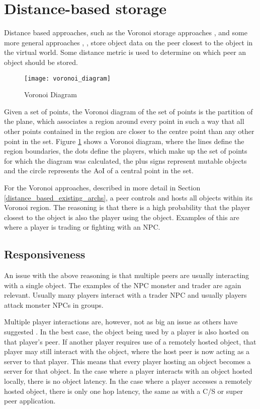 \section{Distance-based storage}
\label{distance_based_storage}

Distance based approaches, such as the Voronoi storage approaches \cite{Buyukkaya_voronoi_state_management}, \cite{Hu_voronoi_IM} and some more general approaches \cite{colyseus_distance_based}, \cite{solipsis}, store object data on the peer closest to the object in the virtual world. Some distance metric is used to determine on which peer an object should be stored.

\begin{figure}[htbp]
 \centering
 \texttt{[image: voronoi\_diagram]}
 \caption{Voronoi Diagram \cite{Buyukkaya_voronoi_state_management}}
 \label{fig_voronoi_diagram}
\end{figure}
%
Given a set of points, the Voronoi diagram of the set of points is the partition of the plane, which associates a region around every point in such a way that all other points contained in the region are closer to the centre point than any other point in the set. Figure \ref{fig_voronoi_diagram} shows a Voronoi diagram, where the lines define the region boundaries, the dots define the players, which make up the set of points for which the diagram was calculated, the plus signs represent mutable objects and the circle represents the AoI of a central point in the set.

For the Voronoi approaches, described in more detail in Section \ref{distance_based_existing_archs}, a peer controls and hosts all objects within its Voronoi region. The reasoning is that there is a high probability that the player closest to the object is also the player using the object. Examples of this are where a player is trading or fighting with an NPC.

\subsection{Responsiveness}

An issue with the above reasoning is that multiple peers are usually interacting with a single object. The examples of the NPC monster and trader are again relevant. Usually many players interact with a trader NPC and usually players attack monster NPCs in groups.

Multiple player interactions are, however, not as big an issue as others have suggested \cite{Fan_deisgn_issues_p2p}. In the best case, the object being used by a player is also hosted on that player's peer. If another player requires use of a remotely hosted object, that player may still interact with the object, where the host peer is now acting as a server to that player. This means that every player hosting an object becomes a server for that object. In the case where a player interacts with an object hosted locally, there is no object latency. In the case where a player
accesses a remotely hosted object, there is only one hop latency, the same as with a C/S or super peer application.

